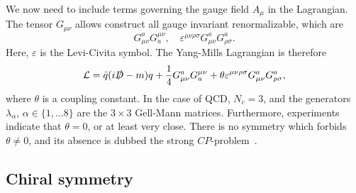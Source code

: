We now need to include terms governing the gauge field $A_\mu$ in the Lagrangian.
The tensor $G_{\mu\nu}$ allows construct all gauge invariant renormalizable, which are
\begin{equation}
    G_{\mu \nu}^a G_a^{\mu \nu}, 
    \quad 
    \varepsilon^{\mu\nu\rho\sigma} G_{\mu \nu}^a G_{\rho \sigma}^a.
\end{equation}
Here, $\varepsilon$ is the Levi-Civita symbol.
The Yang-Mills Lagrangian is therefore
\begin{equation}
    \mathcal{L} = \bar q ( i \slashed{D} - m)q 
    + \frac{1}{4} G_{\mu \nu}^a G_a^{\mu \nu}
    + \theta \varepsilon^{\mu\nu\rho\sigma} G_{\mu \nu}^a G_{\rho \sigma}^a,
\end{equation}
where $\theta$ is a coupling constant. 
In the case of QCD, $N_c = 3$, and the generators $\lambda_\alpha, \, \alpha \in \{1, ... 8\}$ are the $3\times3$ Gell-Mann matrices.
Furthermore, experiments indicate that $\theta = 0$, or at least very close.
There is no symmetry which forbids $\theta \neq 0$, and its absence is dubbed the strong $CP$-problem~\cite{Schwartz:QFT}.

\subsection*{Chiral symmetry}

